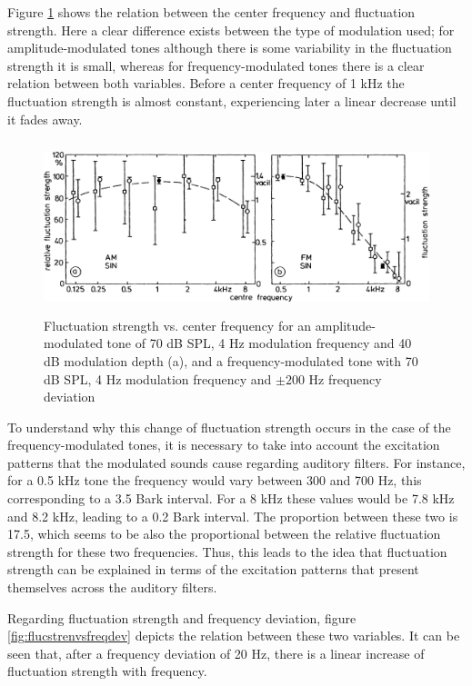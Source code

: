 Figure \ref{fig:flucstrenvscfreq} shows the relation between the center
frequency and fluctuation strength. Here a clear difference exists between the
type of modulation used; for amplitude-modulated tones although there is some
variability in the fluctuation strength it is small, whereas for
frequency-modulated tones there is a clear relation between both variables.
Before a center frequency of 1 kHz the fluctuation strength is almost constant,
experiencing later a linear decrease until it fades away.

\begin{figure}
    \centering
    \includegraphics[height=5cm]
        {img/Fastl2007-FluctuationStrengthVsCenterFrequency.jpg}
    \caption{Fluctuation strength vs. center frequency for an
        amplitude-modulated tone of 70 dB SPL, 4 Hz modulation frequency and 40
        dB modulation depth (a), and a frequency-modulated tone with 70 dB SPL,
        4 Hz modulation frequency and $\pm200$ Hz frequency deviation
        \cite[pp. 250]{Fastl2007Psychoacoustics}}
    \label{fig:flucstrenvscfreq}
\end{figure}

To understand why this change of fluctuation strength occurs in the case of the
frequency-modulated tones, it is necessary to take into account the excitation
patterns that the modulated sounds cause regarding auditory filters. For
instance, for a 0.5 kHz tone the frequency would vary between 300 and 700 Hz,
this corresponding to a 3.5 Bark interval. For a 8 kHz these values would be 7.8
kHz and 8.2 kHz, leading to a 0.2 Bark interval. The proportion between these
two is 17.5, which seems to be also the proportional between the relative
fluctuation strength for these two frequencies. Thus, this leads to the idea
that fluctuation strength can be explained in terms of the excitation patterns
that present themselves across the auditory filters.

Regarding fluctuation strength and frequency deviation, figure
\ref{fig:flucstrenvsfreqdev} depicts the relation between these two variables.
It can be seen that, after a frequency deviation of 20 Hz, there is a linear
increase of fluctuation strength with frequency.

